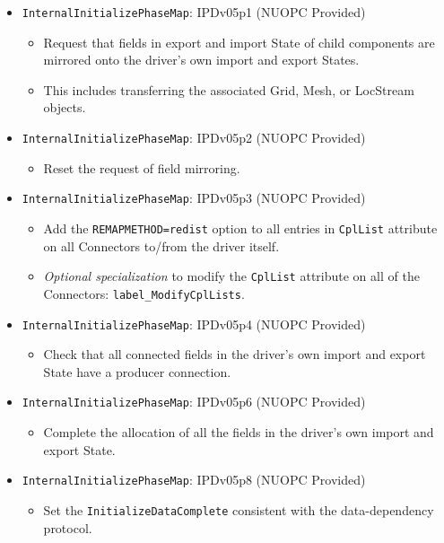 \begin{itemize}
\item {\tt InternalInitializePhaseMap}: IPDv05p1 ({\sc NUOPC Provided})
  \begin{itemize}
  \item Request that fields in export and import State of child components are mirrored onto the driver's own import and export States.
  \item This includes transferring the associated Grid, Mesh, or LocStream objects.
  \end{itemize}  

\item {\tt InternalInitializePhaseMap}: IPDv05p2 ({\sc NUOPC Provided})
  \begin{itemize}
  \item Reset the request of field mirroring.
  \end{itemize}  

\item {\tt InternalInitializePhaseMap}: IPDv05p3 ({\sc NUOPC Provided})
  \begin{itemize}
  \item Add the {\tt REMAPMETHOD=redist} option to all entries in {\tt CplList} attribute on all Connectors to/from the driver itself.
  \item {\it Optional specialization} to modify the {\tt CplList} attribute on all of the Connectors: {\tt label\_ModifyCplLists}.
  \end{itemize}  

\item {\tt InternalInitializePhaseMap}: IPDv05p4 ({\sc NUOPC Provided})
  \begin{itemize}
  \item Check that all connected fields in the driver's own import and export State have a producer connection.
  \end{itemize}  

\item {\tt InternalInitializePhaseMap}: IPDv05p6 ({\sc NUOPC Provided})
  \begin{itemize}
  \item Complete the allocation of all the fields in the driver's own import and export State.
  \end{itemize}  

\item {\tt InternalInitializePhaseMap}: IPDv05p8 ({\sc NUOPC Provided})
  \begin{itemize}
  \item Set the {\tt InitializeDataComplete} consistent with the data-dependency protocol.
  \end{itemize}  

\end{itemize}

